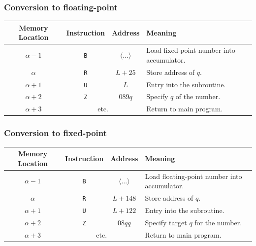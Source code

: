 \subsubsection*{Conversion to floating-point}
\begin{table}[h!]
\centering
\begin{tabularx}{\textwidth}{cccX}
\toprule
\textbf{Memory Location} & \textbf{Instruction} & \textbf{Address} & \textbf{Meaning} \\
\midrule
$\alpha-1$               & \texttt{B}                    & $\langle \dots \rangle$              & Load fixed-point number into accumulator. \\
$\alpha$                 & \texttt{R}                    & $L+25$             & Store address of $q$. \\
$\alpha+1$               & \texttt{U}                    & $L$                & Entry into the subroutine. \\
$\alpha+2$               & \texttt{Z}                    & $089q$           & Specify $q$ of the number. \\
$\alpha+3$               & \multicolumn{2}{c}{etc.}               & Return to main program. \\
\bottomrule
\end{tabularx}
\end{table}

\subsubsection*{Conversion to fixed-point}

\begin{table}[h!]
\centering
\begin{tabularx}{\textwidth}{cccX}
\toprule
\textbf{Memory Location} & \textbf{Instruction} & \textbf{Address} & \textbf{Meaning} \\
\midrule
$\alpha-1$               & \texttt{B}                    & $\langle \dots \rangle$              & Load floating-point number into accumulator. \\
$\alpha$                 & \texttt{R}                    & $L+148$            & Store address of $q$. \\
$\alpha+1$               & \texttt{U}                    & $L+122$            & Entry into the subroutine. \\
$\alpha+2$               & \texttt{Z}                    & $08qq$           & Specify target $q$ for the number. \\
$\alpha+3$               & \multicolumn{2}{c}{etc.}               & Return to main program. \\
\bottomrule
\end{tabularx}
\end{table}

